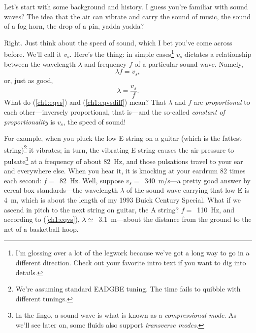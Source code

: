 






Let's start with some background and history. I guess you're familiar with sound
waves? The idea that the air can vibrate and carry the sound of music, the sound
of a fog horn, the drop of a pin, yadda yadda?

Right. Just think about the speed of sound, which I bet you've come across
before. We'll call it $v_s$. Here's the thing: in simple cases\footnote{I'm
  glossing over a lot of the legwork because we've got a long way to go in a
  different direction. Check out your favorite intro text if you want to dig
  into details.}  $v_s$ dictates a relationship between the wavelength $\lambda$
and frequency $f$ of a particular sound wave. Namely,
\begin{equation}
  \label{ch1:eqvs}
  \lambda f = v_s,
\end{equation}
or, just as good,
\begin{equation}
  \label{ch1:eqvsdiff}
  \lambda = \dfrac{v_s}{f}.
\end{equation}
What do (\ref{ch1:eqvs}) and (\ref{ch1:eqvsdiff}) mean? That $\lambda$ and $f$
are \emph{proportional} to each other---inversely proportional, that is---and
the so-called \emph{constant of proportionality} is $v_s$, the speed of
sound!

For example, when you pluck the low E string on a guitar (which is the fattest
string)\footnote{We're assuming standard EADGBE tuning. The time fails to
  quibble with different tunings.} it vibrates; in turn, the vibrating E string
causes the air pressure to pulsate\footnote{In the lingo, a sound wave is what
  is known as a \emph{compressional mode}. As we'll see later on, some fluids
  also support \emph{transverse modes}.} at a frequency of about 82~Hz, and
those pulsations travel to your ear and everywhere else. When you hear it, it is
knocking at your eardrum 82 times each second: $f = $~82~Hz. Well, suppose
$v_s =$~340~m/s---a pretty good answer by cereal box standards---the wavelength
$\lambda$ of the sound wave carrying that low E is 4~m, which is about the
length of my 1993 Buick Century Special. What if we ascend in pitch to the next
string on guitar, the A string?  $f = $~110~Hz, and according to
(\ref{ch1:eqvs}), $\lambda \simeq$~3.1~m---about the distance from the ground to
the net of a basketball hoop.

